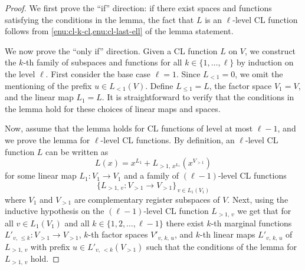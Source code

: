 \begin{proof}
	We first prove the ``if'' direction: if there exist spaces and functions
  satisfying the conditions in the lemma, the fact that $L$ is an $\ell$-level
  CL function follows from \cref{enu:cl-k-cl,enu:cl-last-ell} of the lemma
  statement.

  We now prove the ``only if'' direction.
  Given a CL function $L$ on $V$, we construct the $k$-th family of subspaces
  and functions for all $k \in \{1, \ldots, \ell\}$ by induction on the level
  $\ell$.
  First consider the base case $\ell=1$.
  Since $L_{<1} = 0$, we omit the mentioning of the prefix $u \in L_{<1}(V)$.
  Define $L_{\leq 1} = L$, the factor space $V_1 = V$, and the linear map $L_1 =
  L$.
  It is straightforward to verify that the conditions in the lemma hold for
  these choices of linear maps and spaces.
  
  Now, assume that the lemma holds for CL functions of level at most $\ell - 1$,
  and we prove the lemma for $\ell$-level CL functions.
  By definition, an $\ell$-level CL function $L$ can be written as
  \begin{equation*}
  	L(x) = x^{L_1} + L_{>1,\, x^{L_1}}(x^{V_{>1}})
  \end{equation*}
  for some linear map $L_1 : V_1 \to V_1$ and a family of $(\ell-1)$-level CL
  functions
  \begin{equation*}
    \bigl \{ L_{>1,\, v} : V_{>1} \to V_{>1} \bigr \}_{\, v \in L_1(V_1)}
  \end{equation*}
  where $V_1$ and $V_{>1}$ are complementary register subspaces of $V$.
  Next, using the inductive hypothesis on the $(\ell-1)$-level CL function
  $L_{>1,\, v}$ we get that for all $v \in L_1(V_1)$ and all $k \in \{1, 2,
  \ldots, \ell-1\}$ there exist $k$-th marginal functions $L'_{v,\, \le k}:
  V_{>1} \to V_{>1}$, $k$-th factor spaces $V'_{v,\, k,\, u}$, and $k$-th linear
  maps $L'_{v,\, k,\, u}$ of $L_{>1,\, v}$ with prefix $u \in L'_{v,\,
    <k}(V_{>1})$ such that the conditions of the lemma for $L_{>1,\, v}$ hold.
  

\end{proof}
